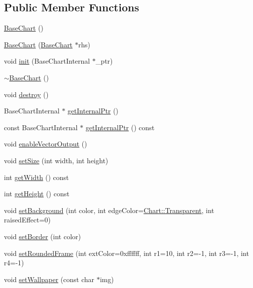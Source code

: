 \subsection*{Public Member Functions}
\begin{DoxyCompactItemize}
\item 
\hyperlink{class_base_chart_aee522a1b201510243ef8c81a1964fd1e}{Base\+Chart} ()
\item 
\hyperlink{class_base_chart_a40e20ec8257eebc80618426119a0bfd6}{Base\+Chart} (\hyperlink{class_base_chart}{Base\+Chart} $\ast$rhs)
\item 
void \hyperlink{class_base_chart_a583eeb7a216ad16fb331f419649fb0e8}{init} (Base\+Chart\+Internal $\ast$\+\_\+ptr)
\item 
\hyperlink{class_base_chart_a4a4e22d0f3a1ae31032a3869406c4b0d}{$\sim$\+Base\+Chart} ()
\item 
void \hyperlink{class_base_chart_a6dbf6be38231b40b064357475d0e7866}{destroy} ()
\item 
Base\+Chart\+Internal $\ast$ \hyperlink{class_base_chart_a5d69ddcea93f12d2a63fbc7d5b640911}{get\+Internal\+Ptr} ()
\item 
const Base\+Chart\+Internal $\ast$ \hyperlink{class_base_chart_aaea2449d249464b87d3f16a7fb9bd95a}{get\+Internal\+Ptr} () const
\item 
void \hyperlink{class_base_chart_ae67229acd792aee7a5b73ac258c6de3f}{enable\+Vector\+Output} ()
\item 
void \hyperlink{class_base_chart_a094bfc84860d6671e638ccd2c96bd364}{set\+Size} (int width, int height)
\item 
int \hyperlink{class_base_chart_a03cb746f83c8b4cc8e49e55986c5e44a}{get\+Width} () const
\item 
int \hyperlink{class_base_chart_a2f337248bcc2c96d9d9b740d1b5752ee}{get\+Height} () const
\item 
void \hyperlink{class_base_chart_ace729351109290982bc624323698cd6e}{set\+Background} (int color, int edge\+Color=\hyperlink{namespace_chart_abee0d882fdc9ad0b001245ad9fc64011afc6811800a9e2582dac0157b6279f836}{Chart\+::\+Transparent}, int raised\+Effect=0)
\item 
void \hyperlink{class_base_chart_a4fe0267a113dda54c013c23679125973}{set\+Border} (int color)
\item 
void \hyperlink{class_base_chart_a5809eecf03754e7211a3d8712b3ff010}{set\+Rounded\+Frame} (int ext\+Color=0xffffff, int r1=10, int r2=-\/1, int r3=-\/1, int r4=-\/1)
\item 
void \hyperlink{class_base_chart_a736e897f2b7239817d17afa5ae48103a}{set\+Wallpaper} (const char $\ast$img)

\end{DoxyCompactItemize}
